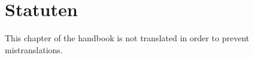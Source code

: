 

\newcommand{\statutensection}[1]{%
    \vspace{-2em}%
    \section*{\small \S{} #1}%
    \vspace{-1em}%
}


\chapter{Statuten}
\label{cha:statuten}

This chapter of the handbook is not translated in order to prevent mistranslations.

